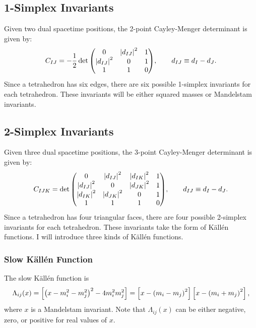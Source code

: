 \subsection{1-Simplex Invariants}
Given two dual spacetime positions, the 2-point Cayley-Menger determinant is given by:
\begin{equation}
	C_{IJ} = -\frac{1}{2} \det{
	\begin{pmatrix}
	0 & \left\lvert d_{IJ} \right\rvert^{2} & 1 \\
	\left\lvert d_{IJ} \right\rvert^{2} & 0 & 1 \\
	1 & 1 & 0
	\end{pmatrix}
	}, \qquad d_{IJ} \equiv d_{I} - d_{J}.
\end{equation}
Since a tetrahedron has six edges, there are six possible 1-simplex invariants for each tetrahedron. These invariants will be either squared masses or Mandelstam invariants.
\subsection{2-Simplex Invariants}
Given three dual spacetime positions, the 3-point Cayley-Menger determinant is given by:
\begin{equation}
	C_{IJK} = \det{
	\begin{pmatrix}
	0 & \left\lvert d_{IJ} \right\rvert^{2} & \left\lvert d_{IK} \right\rvert^{2} & 1 \\
	\left\lvert d_{IJ} \right\rvert^{2} & 0 & \left\lvert d_{JK} \right\rvert^{2} & 1 \\
	\left\lvert d_{IK} \right\rvert^{2} & \left\lvert d_{JK} \right\rvert^{2} & 0 & 1 \\
	1 & 1 & 1 & 0
	\end{pmatrix}
	}, \qquad d_{IJ} \equiv d_{I} - d_{J}.
\end{equation}
Since a tetrahedron has four triangular faces, there are four possible 2-simplex invariants for each tetrahedron. These invariants take the form of K\"{a}ll\'{e}n functions. I will introduce three kinds of K\"{a}ll\'{e}n functions.
\subsubsection{Slow K\"{a}ll\'{e}n Function}
The slow K\"{a}ll\'{e}n function is
\begin{equation}
	\Lambda_{ij}(x) = \left[ \left(x - m_{i}^{2} - m_{j}^{2} \right)^{2} - 4 m_{i}^{2} m_{j}^{2} \right] = \left[ x - \left( m_{i} - m_{j} \right)^{2} \right] \left[ x - \left( m_{i} + m_{j} \right)^{2} \right],
\end{equation}
where $x$ is a Mandelstam invariant. Note that $\Lambda_{ij}(x)$ can be either negative, zero, or positive for real values of $x$.

